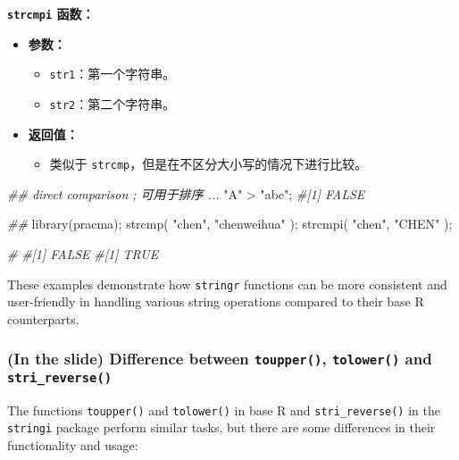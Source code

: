 \documentclass[
]{article}
\newenvironment{Shaded}{}{}
\newcommand{\CommentTok}[1]{\textcolor[rgb]{0.38,0.63,0.69}{\textit{#1}}}
\newcommand{\DocumentationTok}[1]{\textcolor[rgb]{0.73,0.13,0.13}{\textit{#1}}}
\newcommand{\FunctionTok}[1]{\textcolor[rgb]{0.02,0.16,0.49}{#1}}
\newcommand{\NormalTok}[1]{#1}
\newcommand{\SpecialCharTok}[1]{\textcolor[rgb]{0.25,0.44,0.63}{#1}}
\newcommand{\StringTok}[1]{\textcolor[rgb]{0.25,0.44,0.63}{#1}}
\begin{document}
\textbf{\texttt{strcmpi} 函数：}

\begin{itemize}
\item
  \textbf{参数：}

  \begin{itemize}
  \item
    \texttt{str1}：第一个字符串。
  \item
    \texttt{str2}：第二个字符串。
  \end{itemize}
\item
  \textbf{返回值：}

  \begin{itemize}
  \item
    类似于 \texttt{strcmp}，但是在不区分大小写的情况下进行比较。
  \end{itemize}
\end{itemize}

\begin{Shaded}
\begin{Highlighting}[]
\DocumentationTok{\#\# direct comparison ; 可用于排序 ...}
\StringTok{"A"} \SpecialCharTok{\textgreater{}} \StringTok{"abc"}\NormalTok{;}
\CommentTok{\#[1] FALSE}

\DocumentationTok{\#\# }
\FunctionTok{library}\NormalTok{(pracma);}
\FunctionTok{strcmp}\NormalTok{( }\StringTok{"chen"}\NormalTok{, }\StringTok{"chenweihua"}\NormalTok{ );}
\FunctionTok{strcmpi}\NormalTok{( }\StringTok{"chen"}\NormalTok{, }\StringTok{"CHEN"}\NormalTok{ );}

\CommentTok{\#}
\CommentTok{\#[1] FALSE}
\CommentTok{\#[1] TRUE}
\end{Highlighting}
\end{Shaded}

These examples demonstrate how \texttt{stringr} functions can be more
consistent and user-friendly in handling various string operations
compared to their base R counterparts.

\hypertarget{in-the-slide-difference-between-toupper-tolower-and-strireverse}{%
\subsubsection{\texorpdfstring{\textbf{(In the slide)} Difference
between \texttt{toupper()}, \texttt{tolower()} and
\texttt{stri\_reverse()}}{(In the slide) Difference between toupper(), tolower() and stri\_reverse()}}\label{in-the-slide-difference-between-toupper-tolower-and-strireverse}}

The functions \texttt{toupper()} and \texttt{tolower()} in base R and
\texttt{stri\_reverse()} in the \texttt{stringi} package perform similar
tasks, but there are some differences in their functionality and usage:
\end{document}
